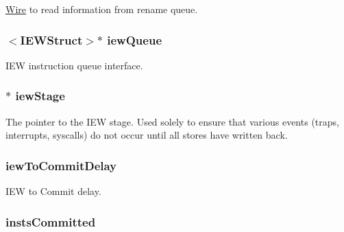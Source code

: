 \label{classDefaultCommit_a2b6b1d4785b92bd378f8a7abc5b7e6b9}
\hyperlink{classWire}{Wire} to read information from rename queue. \hypertarget{classDefaultCommit_a034b0868914c304e81c13c4e645d2616}{
\subsubsection[{iewQueue}]{$<${\bf IEWStruct}$>$$\ast$ {\bf iewQueue}}}
\label{classDefaultCommit_a034b0868914c304e81c13c4e645d2616}
IEW instruction queue interface. \hypertarget{classDefaultCommit_a4e9ef25d8913b270d432be4bbfe4965c}{
\subsubsection[{iewStage}]{$\ast$ {\bf iewStage}}}
\label{classDefaultCommit_a4e9ef25d8913b270d432be4bbfe4965c}
The pointer to the IEW stage. Used solely to ensure that various events (traps, interrupts, syscalls) do not occur until all stores have written back. \hypertarget{classDefaultCommit_a29f74b65419ba8f0ae250d65e960202b}{
\subsubsection[{iewToCommitDelay}]{ {\bf iewToCommitDelay}}}
\label{classDefaultCommit_a29f74b65419ba8f0ae250d65e960202b}
IEW to Commit delay. \hypertarget{classDefaultCommit_a23714085cc19270c017a67c9a508601a}{
\subsubsection[{instsCommitted}]{ {\bf instsCommitted}}}
